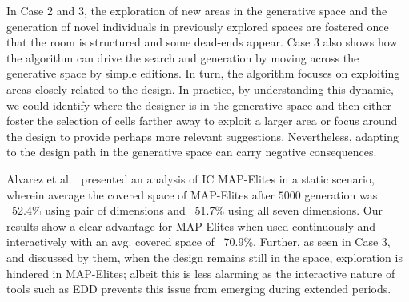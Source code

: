 
In Case 2 and 3, the exploration of new areas in the generative space and the generation of novel individuals in previously explored spaces are fostered once that the room is structured and some dead-ends appear. Case 3 also shows how the algorithm can drive the search and generation by moving across the generative space by simple editions. In turn, the algorithm focuses on exploiting areas closely related to the design. In practice, by understanding this dynamic, we could identify where the designer is in the generative space and then either foster the selection of cells farther away to exploit a larger area or focus around the design to provide perhaps more relevant suggestions. Nevertheless, adapting to the design path in the generative space can carry negative consequences. 

Alvarez et al.~\cite{Alvarez2020-ICMAPE} presented an analysis of IC MAP-Elites in a static scenario, wherein average the covered space of MAP-Elites after $5000$ generation was ~52.4\% using pair of dimensions and ~51.7\% using all seven dimensions. Our results show a clear advantage for MAP-Elites when used continuously and interactively with an avg. covered space of ~70.9\%. Further, as seen in Case 3, and discussed by them, when the design remains still in the space, exploration is hindered in MAP-Elites; albeit this is less alarming as the interactive nature of tools such as EDD prevents this issue from emerging during extended periods.




